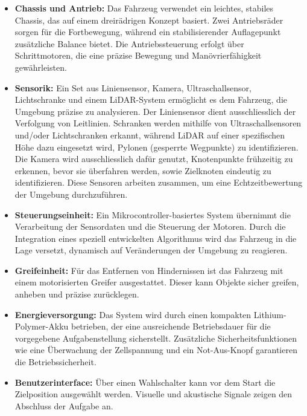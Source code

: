 \documentclass[main.tex]{subfiles} %
\begin{document}
\begin{itemize}
    \item \textbf{Chassis und Antrieb:} Das Fahrzeug verwendet ein leichtes, stabiles Chassis, das auf einem dreirädrigen Konzept basiert. Zwei Antriebsräder sorgen für die Fortbewegung, während ein stabilisierender Auflagepunkt zusätzliche Balance bietet. Die Antriebssteuerung erfolgt über Schrittmotoren, die eine präzise Bewegung und Manövrierfähigkeit gewährleisten.

    \item \textbf{Sensorik:} Ein Set aus Liniensensor, Kamera, Ultraschallsensor, Lichtschranke und einem LiDAR-System ermöglicht es dem Fahrzeug, die Umgebung präzise zu analysieren. Der Liniensensor dient ausschliesslich der Verfolgung von Leitlinien. Schranken werden mithilfe von Ultraschallsensoren und/oder Lichtschranken erkannt, während LiDAR auf einer spezifischen Höhe dazu eingesetzt wird, Pylonen (gesperrte Wegpunkte) zu identifizieren. Die Kamera wird ausschliesslich dafür genutzt, Knotenpunkte frühzeitig zu erkennen, bevor sie überfahren werden, sowie Zielknoten eindeutig zu identifizieren. Diese Sensoren arbeiten zusammen, um eine Echtzeitbewertung der Umgebung durchzuführen.

    \item \textbf{Steuerungseinheit:} Ein Mikrocontroller-basiertes System übernimmt die Verarbeitung der Sensordaten und die Steuerung der Motoren. Durch die Integration eines speziell entwickelten Algorithmus wird das Fahrzeug in die Lage versetzt, dynamisch auf Veränderungen der Umgebung zu reagieren.

    \item \textbf{Greifeinheit:} Für das Entfernen von Hindernissen ist das Fahrzeug mit einem motorisierten Greifer ausgestattet. Dieser kann Objekte sicher greifen, anheben und präzise zurücklegen.

    \item \textbf{Energieversorgung:} Das System wird durch einen kompakten Lithium-Polymer-Akku betrieben, der eine ausreichende Betriebsdauer für die vorgegebene Aufgabenstellung sicherstellt. Zusätzliche Sicherheitsfunktionen wie eine Überwachung der Zellspannung und ein Not-Aus-Knopf garantieren die Betriebssicherheit.

    \item \textbf{Benutzerinterface:} Über einen Wahlschalter kann vor dem Start die Zielposition ausgewählt werden. Visuelle und akustische Signale zeigen den Abschluss der Aufgabe an.


\end{itemize}
\end{document}
